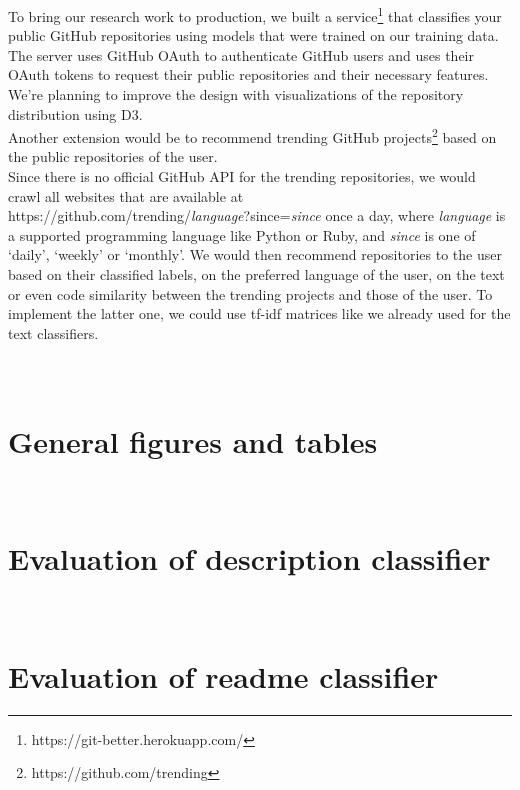 \documentclass[%
a4paper,
DIV12,
2.5headlines,
bigheadings,
titlepage,
openbib,
]{scrartcl}
\begin{document}
To bring our research work to production, we built a service\footnote{https://git-better.herokuapp.com/} that classifies your public GitHub repositories using models that were trained on our training data.
The server uses GitHub OAuth to authenticate GitHub users and uses their OAuth tokens to request their public repositories and their necessary features.
We're planning to improve the design with visualizations of the repository distribution using D3.\\
Another extension would be to recommend trending GitHub projects\footnote{https://github.com/trending} based on the public repositories of the user.\\
Since there is no official GitHub API for the trending repositories, we would crawl all websites that are available at \\
https://github.com/trending/\textit{language}?since=\textit{since} once a day, where \textit{language} is a supported programming language like Python or Ruby, and \textit{since} is one of `daily', `weekly' or `monthly'.
We would then recommend repositories to the user based on their classified labels, on the preferred language of the user, on the text or even code similarity between the trending projects and those of the user.
To implement the latter one, we could use tf-idf matrices like we already used for the text classifiers.


\newpage
\appendix
\section{\\General figures and tables} \label{App:AppendixA}

\FloatBarrier

\FloatBarrier

\newpage
\section{\\Evaluation of description classifier} \label{App:AppendixB}

\FloatBarrier

\FloatBarrier

\newpage
\section{\\Evaluation of readme classifier} \label{App:AppendixF}
\end{document}
